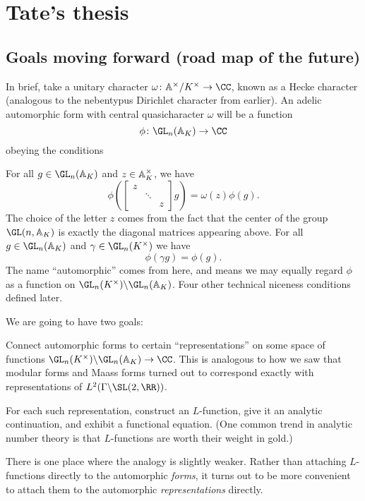 \chapter{Tate's thesis}
\section{Goals moving forward (road map of the future)}
In brief, take a unitary character
$\omega \colon \AA^\times / K^\times \to \CC$,
known as a \alert{Hecke character}
(analogous to the nebentypus Dirichlet character from earlier).
An adelic automorphic form with central quasicharacter
$\omega$ will be a function
\[ \phi \colon \GL_n(\AA_K) \to \CC \]
obeying the conditions
\begin{itemize}
  \ii For all $g \in \GL_n(\AA_K)$
    and $z \in \AA_K^\times$, we have
  \[
    \phi\left(
      \begin{bmatrix}
        z \\ & \ddots \\ && z
      \end{bmatrix}
      g
    \right) = \omega(z) \phi(g).
  \]
  The choice of the letter $z$ comes from the fact
  that the center of the group $\GL(n, \AA_K)$
  is exactly the diagonal matrices appearing above.
  \ii For all $g \in \GL_n(\AA_K)$ and
  $\gamma \in \GL_n( K^\times)$ we have
  \[ \phi(\gamma g) = \phi(g). \]
  The name ``automorphic'' comes from here,
  and means we may equally regard
  $\phi$ as a function on
  $\GL_n(K^\times) \backslash \GL_n(\AA_K)$.
  \ii Four other technical niceness conditions defined later.
\end{itemize}
We are going to have two goals:
\begin{description}
  Connect automorphic forms to certain
  ``representations'' on some space of functions
  $\GL_n(K^\times) \backslash \GL_n(\AA_K) \to \CC$.
  This is analogous to how we saw that modular forms
  and Maass forms turned out to correspond exactly
  with representations of $L^2(\Gamma \backslash \SL(2,\RR))$.

  For each such representation, construct an $L$-function,
  give it an analytic continuation, and exhibit a functional equation.
  (One common trend in analytic number theory
  is that $L$-functions are worth their weight in gold.)
\end{description}
There is one place where the analogy is slightly weaker.
Rather than attaching $L$-functions directly to the
automorphic \emph{forms},
it turns out to be more convenient to attach them to the
automorphic \emph{representations} directly.

